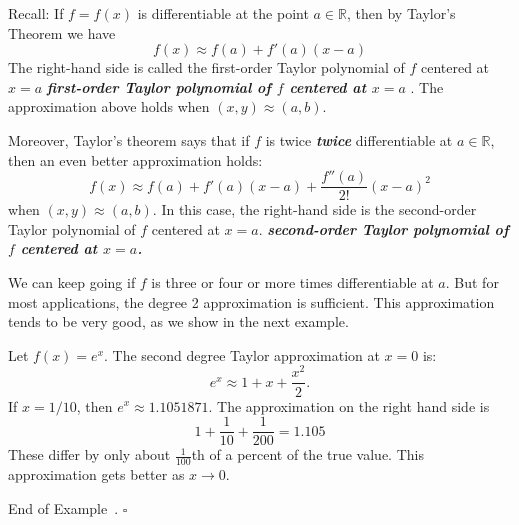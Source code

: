 \documentclass[10pt]{article}
\DeclareRobustCommand{\demph}[1]{%
  \ifmmode
  {\color{Blue}#1}%
  \else
  {\color{Blue}\bfseries\slshape #1}%
  \fi
}
\theoremstyle{definition}
\newtheorem{example}[theorem]{Example}
\renewenvironment{example}
{\begin{oldexample}}
  {\par\smallskip\hfill   End of Example~\theexample. $\square$    \par\end{oldexample}}
\newcommand{\1}[1]{\textbf{1}_{\left[#1\right]}} %
\def\R{\mathbb{R}} %
\begin{document}
Recall: If $f=f(x)$ is differentiable at the point $a\in \R$, then by
Taylor's Theorem we have
\begin{equation*}
  f(x) \approx
  f(a)+f'(a)(x-a)
\end{equation*}
The right-hand side is called the \demph{first-order Taylor polynomial of $f$
centered at $x=a$}. The approximation above holds when  $(x,y) \approx (a,b)$.

Moreover, Taylor's theorem says that if $f$ is \demph{twice} differentiable at
$a\in \R$, then an even better approximation holds:
\begin{equation*}
  f(x) \approx
  f(a)+f'(a)(x-a)+\frac{f''(a)}{2!}(x-a)^{2}
\end{equation*}
when $(x,y) \approx (a,b)$. In this case, the right-hand side is the
\demph{second-order Taylor polynomial of $f$ centered at $x=a$.}

We can keep going if $f$ is three or four or more times differentiable at $a$.
But for most applications, the degree 2 approximation is sufficient. This
approximation tends to be very good, as we show in the next example.

\begin{example}
  Let $f(x) = e^{x}$. The second degree Taylor approximation at $x=0$ is:
  \begin{equation*}
    e^{x} \approx 1+x+\frac{x^{2}}{2}.
  \end{equation*}
  If $x=1/10$, then $e^{x}\approx 1.1051871$. The approximation on the right
  hand side is
  \begin{equation*}
    1+\frac{1}{10}+\frac{1}{200} = 1.105
  \end{equation*}
  These differ by only about $\frac{1}{100}$th of a percent of the true value.
  This approximation gets better as $x \to 0$.
\end{example}
\end{document}
